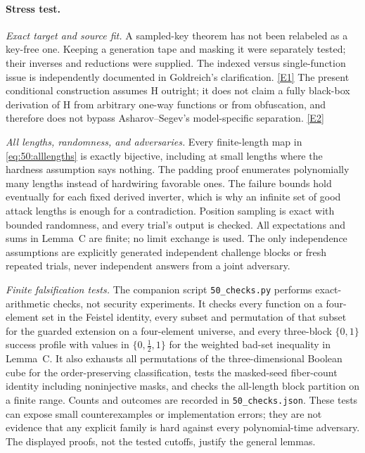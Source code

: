 \documentclass[11pt,a4paper]{article}
\newcommand{\eref}[2]{\hyperlink{extra:#1:#2}{[E#2]}}
\numberwithin{equation}{section}
\begin{document}
\paragraph{Stress test.}
\textit{Exact target and source fit.}
A sampled-key theorem has not been relabeled as a key-free one. Keeping
a generation tape and masking it were separately tested; their inverses
and reductions were supplied. The indexed versus single-function issue
is independently documented in Goldreich's clarification.
\eref{50}{1} The present conditional construction assumes H outright;
it does not claim a fully black-box derivation of H from arbitrary
one-way functions or from obfuscation, and therefore does not bypass
Asharov--Segev's model-specific separation. \eref{50}{2}

\textit{All lengths, randomness, and adversaries.}
Every finite-length map in \eqref{eq:50:alllengths} is exactly bijective,
including at small lengths where the hardness assumption says nothing.
The padding proof enumerates polynomially many lengths instead of
hardwiring favorable ones. The failure bounds hold eventually for each
fixed derived inverter, which is why an infinite set of good attack
lengths is enough for a contradiction. Position sampling is exact with
bounded randomness, and every trial's output is checked. All
expectations and sums in Lemma~C are finite; no limit exchange is used.
The only independence assumptions are explicitly generated independent
challenge blocks or fresh repeated trials, never independent answers
from a joint adversary.

\textit{Finite falsification tests.}
The companion script \texttt{50\_checks.py} performs exact-arithmetic
checks, not security experiments. It checks every function on a
four-element set in the Feistel identity, every subset and permutation
of that subset for the guarded extension on a four-element universe,
and every three-block $\{0,1\}$ success profile with values in
$\{0,\tfrac12,1\}$ for the weighted bad-set inequality in Lemma~C.
It also exhausts all permutations of the three-dimensional Boolean
cube for the order-preserving classification, tests the masked-seed
fiber-count identity including noninjective masks, and checks the
all-length block partition on a finite range. Counts and outcomes are
recorded in \texttt{50\_checks.json}. These tests can expose small
counterexamples or implementation errors; they are not evidence that
any explicit family is hard against every polynomial-time adversary.
The displayed proofs, not the tested cutoffs, justify the general
lemmas.
\end{document}
